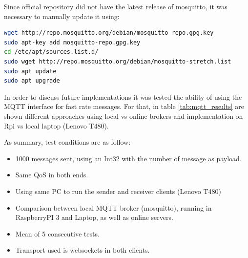 Since official repository did not have the latest release of mosquitto, it was necessary to
manually update it using:

\begin{lstlisting}[frame=none,language=bash,backgroundcolor=\color{gray!15},numbers=none,		basicstyle=\ttfamily]
wget http://repo.mosquitto.org/debian/mosquitto-repo.gpg.key
sudo apt-key add mosquitto-repo.gpg.key
cd /etc/apt/sources.list.d/
sudo wget http://repo.mosquitto.org/debian/mosquitto-stretch.list
sudo apt update
sudo apt upgrade
\end{lstlisting}

In order to discuss future implementations it was tested the ability of using the \gls{MQTT} interface for fast rate messages. For that, in table \ref{tab:mqtt_results} are shown different approaches using local vs online brokers and implementation on \gls{Rpi} vs local laptop (Lenovo T480).

As summary, test conditions are as follow:
\begin{itemize}
	\tightlist
	\item 1000 messages sent, using an Int32 with the number of message as payload.
	\item Same \gls{QoS} in both ends.
	\item Using same PC to run the sender and receiver clients (Lenovo T480)
	\item Comparison between local MQTT broker (mosquitto), running in RaspberryPI 3 and Laptop, as well as online servers.
	\item Mean of 5 consecutive tests.
	\item Transport used is websockets in both clients.
\end{itemize}

